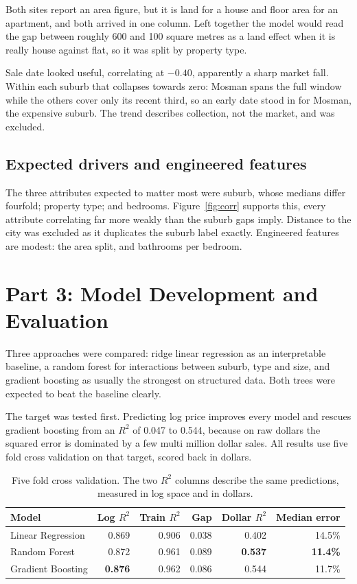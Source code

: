 \documentclass[11pt,a4paper]{article}
\begin{document}
Both sites report an area figure, but it is land for a house and floor
area for an apartment, and both arrived in one column. Left together the
model would read the gap between roughly 600 and 100 square metres as a
land effect when it is really house against flat, so it was split by
property type.

Sale date looked useful, correlating at $-0.40$, apparently a sharp
market fall. Within each suburb that collapses towards zero: Mosman
spans the full window while the others cover only its recent third, so
an early date stood in for Mosman, the expensive suburb. The trend
describes collection, not the market, and was excluded.

\subsection{Expected drivers and engineered features}

The three attributes expected to matter most were suburb, whose medians
differ fourfold; property type; and bedrooms. Figure~\ref{fig:corr}
supports this, every attribute correlating far more weakly than the
suburb gaps imply. Distance to the city was excluded as it duplicates
the suburb label exactly. Engineered features are modest: the area
split, and bathrooms per bedroom.

\section{Part 3: Model Development and Evaluation}

Three approaches were compared: ridge linear regression as an
interpretable baseline, a random forest for interactions between suburb,
type and size, and gradient boosting as usually the strongest on
structured data. Both trees were expected to beat the baseline clearly.

The target was tested first. Predicting log price improves every model
and rescues gradient boosting from an $R^2$ of 0.047 to 0.544, because
on raw dollars the squared error is dominated by a few multi million
dollar sales. All results use five fold cross validation on that target,
scored back in dollars.

\begin{table}[H]
\centering
\small
\caption{Five fold cross validation. The two $R^2$ columns describe the
same predictions, measured in log space and in dollars.}
\label{tab:models}
\begin{tabular}{lrrrrr}
\toprule
\textbf{Model} & \textbf{Log $R^2$} & \textbf{Train $R^2$} & \textbf{Gap} & \textbf{Dollar $R^2$} & \textbf{Median error} \\
\midrule
Linear Regression & 0.869 & 0.906 & 0.038 & 0.402 & 14.5\% \\
Random Forest     & 0.872 & 0.961 & 0.089 & \textbf{0.537} & \textbf{11.4\%} \\
Gradient Boosting & \textbf{0.876} & 0.962 & 0.086 & 0.544 & 11.7\% \\
\bottomrule
\end{tabular}
\end{table}
\end{document}
